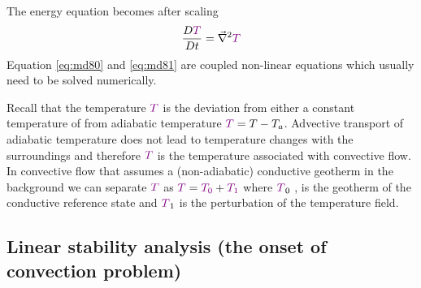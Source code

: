 The energy equation becomes after scaling
\begin{equation}
\frac{D{\color{violet}T}}{Dt} = \vec\nabla^2 {\color{violet}T}
\label{eq:md81}
\end{equation}
Equation \eqref{eq:md80} and \eqref{eq:md81} are coupled non-linear equations
which usually need to be solved numerically.



Recall that the temperature ${\color{violet}T}$ 
is the deviation from either a constant temperature of from
adiabatic temperature ${\color{violet}T} = T-T_a$. 
Advective transport of adiabatic temperature does not
lead to temperature changes with the surroundings and therefore  ${\color{violet}T}$ is the temperature
associated with convective flow. In convective flow that assumes a (non-adiabatic)
conductive geotherm in the background we can separate ${\color{violet}T}$ 
as  ${\color{violet}T}={\color{violet}T_0}+{\color{violet}T_1}$ 
where  ${\color{violet}T}_0$ , is the
geotherm of the conductive reference state and 
 ${\color{violet}T}_1$ is the perturbation of the temperature
field.

\vspace{0.5cm}
\vspace{0.5cm}


\subsection{Linear stability analysis (the onset of convection problem)}

